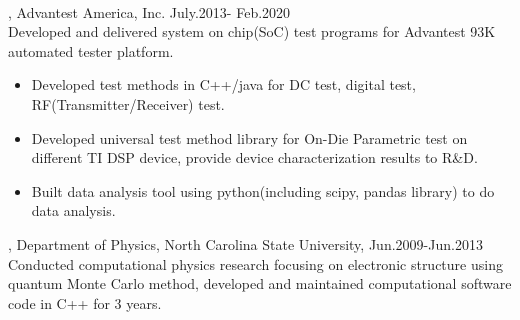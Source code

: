 \documentclass[11pt]{article} %
\begin{document}
\\
, Advantest America, Inc. July.2013- Feb.2020\\
\noindent Developed and delivered system on chip(SoC) test programs for Advantest 93K automated tester platform.\\ 
\begin{itemize}
  
    \item Developed test methods in C++/java for DC test, digital test, RF(Transmitter/Receiver) test.\\
 \vspace{-4mm}
    \item  Developed universal test method library for On-Die Parametric test on different TI DSP device, provide device characterization results to R\&D.\\ 
  \vspace{-4mm}
 \item  Built data analysis tool using python(including scipy, pandas library) to do data analysis.
  
 \end{itemize}
 \vspace{1mm}
, Department of Physics, North Carolina State University, Jun.2009-Jun.2013\\
\noindent Conducted computational physics research focusing on electronic structure using quantum Monte Carlo method, developed and maintained computational software code in C++ for 3 years.\\
\end{document}
